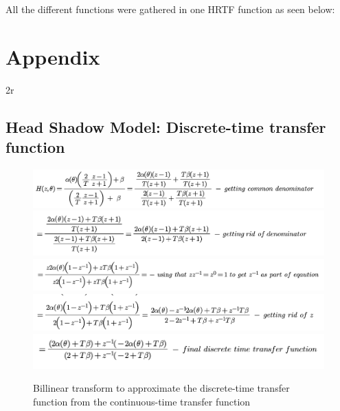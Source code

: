 \documentclass{assignment}
\begin{document}
All the different functions were gathered in one HRTF function as seen below: 



\newpage
\section{Appendix}2r

\subsection{Head Shadow Model: Discrete-time transfer function}
\begin{figure}[h]
    \centering
    \includegraphics[scale=0.5]{assets/b1.png}
    \includegraphics[scale=0.5]{assets/b2.png}
    \includegraphics[scale=0.5]{assets/b3.png}
    \includegraphics[scale=0.5]{assets/b4.png}
    \includegraphics[scale=0.5]{assets/b5.png}
    \caption{Billinear transform to approximate the discrete-time transfer function from the continuous-time transfer function}
    \label{fig:my_label}
\end{figure}

\newpage 
\end{document}

